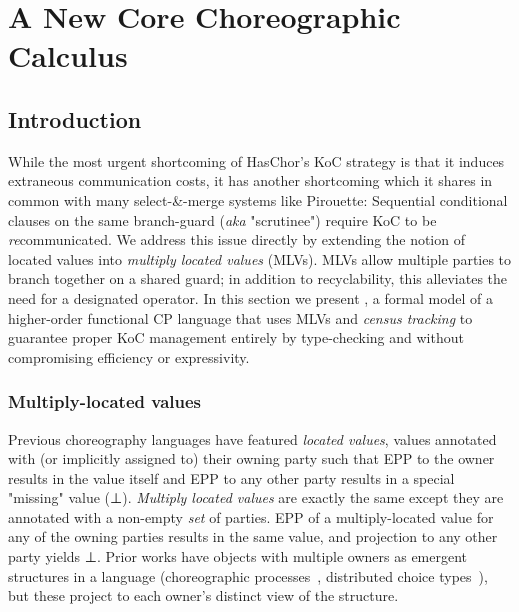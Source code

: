 \chapter{A New Core Choreographic Calculus}
\label{sec:formalism}


\section{Introduction}
While the most urgent shortcoming of HasChor's KoC strategy is that it induces extraneous communication costs,
it has another shortcoming which it shares in common with many select-\&-merge systems like Pirouette:
Sequential conditional clauses on the same branch-guard (\textit{aka} "scrutinee") require KoC to be \emph{re}communicated.
We address this issue directly by extending the notion of located values into \emph{multiply located values} (MLVs).
MLVs allow multiple parties to branch together on a shared guard;
in addition to recyclability, this alleviates the need for a designated  operator.
In this section we present \HLSCentral,
a formal model of a higher-order functional CP language that uses MLVs and \emph{census tracking}
to guarantee proper KoC management entirely by type-checking and without compromising efficiency or expressivity.


\subsection{Multiply-located values}
\label{sec:mlvs}

Previous choreography languages have featured \emph{located values},
values annotated with (or implicitly assigned to) their owning party such that EPP to the owner results
in the value itself and EPP to any other party results in a special
"missing" value (\eg ⊥).
\emph{Multiply located values} are exactly the same except they are annotated with a non-empty \emph{set} of parties.
EPP of a multiply-located value for any of the owning parties results in the same value,
and projection to any other party yields ⊥.
Prior works have objects with multiple owners as emergent structures in a language
(\eg choreographic processes~\cite{giallorenzo-choral}, distributed choice types~\cite{chor-lambda-2}),
but these project to each owner's distinct view of the structure.

